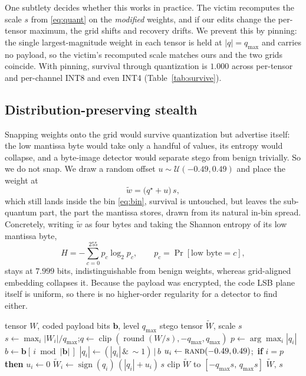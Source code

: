\documentclass[10pt,journal]{IEEEtran}
\theoremstyle{remark}
\begin{document}
One subtlety decides whether this works in practice. The victim recomputes the scale
$s$ from \eqref{eq:quant} on the \emph{modified} weights, and if our edits change the
per-tensor maximum, the grid shifts and recovery drifts. We prevent this by pinning:
the single largest-magnitude weight in each tensor is held at $|q|{=}q_{\max}$ and
carries no payload, so the victim's recomputed scale matches ours and the two grids
coincide. With pinning, survival through quantization is $1.000$ across per-tensor and
per-channel INT8 and even INT4 (Table~\ref{tab:survive}).


\subsection{Distribution-preserving stealth}
Snapping weights onto the grid would survive quantization but advertise itself: the
low mantissa byte would take only a handful of values, its entropy would collapse, and
a byte-image detector would separate stego from benign trivially. So we do not snap.
We draw a random offset $u\sim\mathcal{U}(-0.49,0.49)$ and place the weight at
\begin{equation}\label{eq:embed}
\tilde w=\big(q^\star+u\big)\,s,
\end{equation}
which still lands inside the bin \eqref{eq:bin}, survival is untouched, but
leaves the sub-quantum part, the part the mantissa stores, drawn from its natural
in-bin spread. Concretely, writing $\tilde w$ as four bytes and taking the Shannon
entropy of its low mantissa byte,
\begin{equation}\label{eq:entropy}
H=-\sum_{c=0}^{255} p_c\log_2 p_c,\qquad p_c=\Pr[\text{low byte}=c],
\end{equation}
stays at $7.999$ bits, indistinguishable from benign weights, whereas grid-aligned
embedding collapses it. Because the payload was encrypted, the code LSB plane itself is
uniform, so there is no higher-order regularity for a detector to find either.

\begin{algorithm}[t]
\caption{Quantization-aware stealthy embedding (per weight tensor)}
\label{alg:embed}
\begin{algorithmic}[1]
\Require tensor $W$, coded payload bits $\mathbf b$, level $q_{\max}$
\Ensure stego tensor $\tilde W$, scale $s$
\State $s\gets \max_i|W_i|/q_{\max}$;\quad $q\gets\operatorname{clip}(\operatorname{round}(W/s),-q_{\max},q_{\max})$
\State $p\gets\arg\max_i|q_i|$ 
  \State $b\gets \mathbf b[\,i \bmod |\mathbf b|\,]$ 
  \State $|q_i|\gets(|q_i|\,\&\,{\sim}1)\,\vert\,b$ 
  \State $u_i\gets\textsc{rand}(-0.49,0.49)$;\ \textbf{if } $i{=}p$ \textbf{ then } $u_i\gets0$
  \State $\tilde W_i\gets\operatorname{sign}(q_i)\,(|q_i|+u_i)\,s$
\EndFor
\State clip $\tilde W$ to $[-q_{\max}s,\,q_{\max}s]$ 
\State \Return $\tilde W,\,s$
\end{algorithmic}
\end{algorithm}
\end{document}
